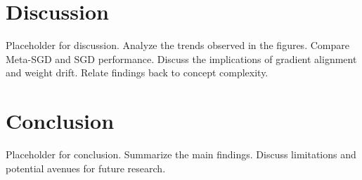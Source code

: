 \documentclass[11pt, a4paper]{article}
\begin{document}

\section{Discussion}
Placeholder for discussion.
Analyze the trends observed in the figures.
Compare Meta-SGD and SGD performance.
Discuss the implications of gradient alignment and weight drift.
Relate findings back to concept complexity.

\section{Conclusion}
Placeholder for conclusion.
Summarize the main findings.
Discuss limitations and potential avenues for future research.

\end{document}
